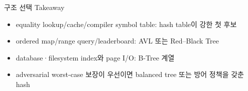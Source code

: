 \begin{frame}{구조 선택 Takeaway}
\begin{itemize}
\item equality lookup/cache/compiler symbol table: hash table이 강한 첫 후보
\item ordered map/range query/leaderboard: AVL 또는 Red--Black Tree
\item database·filesystem index와 page I/O: B-Tree 계열
\item adversarial worst-case 보장이 우선이면 balanced tree 또는 방어 정책을 갖춘 hash
\end{itemize}
\end{frame}
